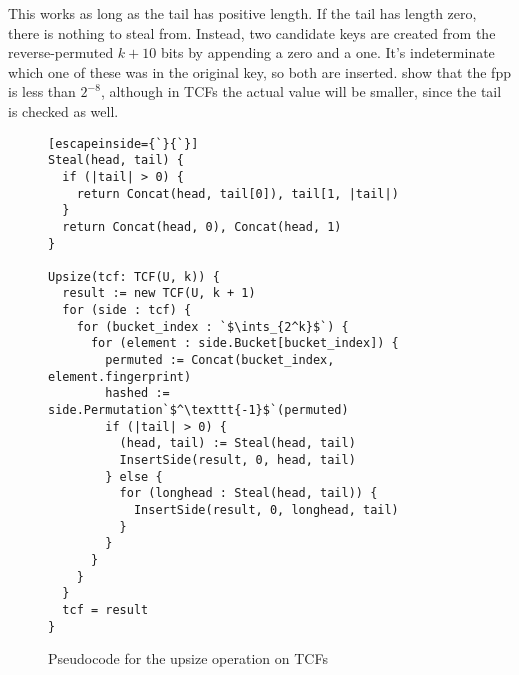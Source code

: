 \documentclass[manuscript,screen,review]{acmart}
\newcommand{\ints}{\mathbb{Z}}
\begin{document}
This works as long as the tail has positive length.
If the tail has length zero, there is nothing to steal from.
Instead, two candidate keys are created from the reverse-permuted $k+10$ bits by appending a zero and a one.
It's indeterminate which one of these was in the original key, so both are inserted.
\cite{psw} show that the fpp is less than $2^{-8}$, although in TCFs the actual value will be smaller, since the tail is checked as well.

\begin{figure}

\begin{lstlisting}[escapeinside={`}{`}]
Steal(head, tail) {
  if (|tail| > 0) {
    return Concat(head, tail[0]), tail[1, |tail|)
  }
  return Concat(head, 0), Concat(head, 1)
}

Upsize(tcf: TCF(U, k)) {
  result := new TCF(U, k + 1)
  for (side : tcf) {
    for (bucket_index : `$\ints_{2^k}$`) {
      for (element : side.Bucket[bucket_index]) {
        permuted := Concat(bucket_index, element.fingerprint)
        hashed := side.Permutation`$^\texttt{-1}$`(permuted)
        if (|tail| > 0) {
          (head, tail) := Steal(head, tail)
          InsertSide(result, 0, head, tail)
        } else {
          for (longhead : Steal(head, tail)) {
            InsertSide(result, 0, longhead, tail)
          }
        }
      }
    }
  }
  tcf = result
}
\end{lstlisting}
\caption{\label{tcf-upsize}
Pseudocode for the upsize operation on TCFs}

\end{figure}



\end{document}
